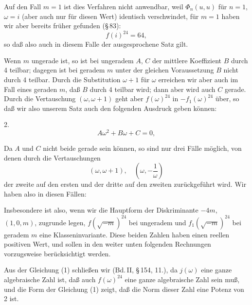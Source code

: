 

Auf den Fall $m=1$ ist dies Verfahren nicht anwendbar, weil $\Phi_n(u,u)$ für $n=1$, $\omega=i$ (aber auch nur für diesen Wert) identisch verschwindet, für $m=1$ haben wir aber bereits früher gefunden (\S\,83):
\[
f(i)^{24}=64,
\]
so daß also auch in diesem Falle der ausgesprochene Satz gilt.

Wenn $m$ ungerade ist, so ist bei ungeradem $A$, $C$ der mittlere Koeffizient $B$ durch 4 teilbar; dagegen ist bei geradem $m$ unter der gleichen Voraussetzung $B$ nicht durch 4 teilbar. Durch die Substitution $\omega+1$ für $\omega$ erreichen wir aber auch im Fall eines geraden $m$, daß $B$ durch 4 teilbar wird; dann aber wird auch $C$ gerade. Durch die Vertauschung $(\omega,\omega+1)$ geht aber $f(\omega)^{24}$ in $-f_1(\omega)^{24}$ über, so daß wir also unserem Satz auch den folgenden Ausdruck geben können:

2. 
\[
A\omega^2+B\omega+C=0,
\]

Da $A$ und $C$ nicht beide gerade sein können, so sind nur drei Fälle möglich, von denen durch die Vertauschungen
\[
(\omega,\omega+1),\quad \left(\omega,-\frac{1}{\omega}\right)
\]
der zweite auf den ersten und der dritte auf den zweiten zurückgeführt wird. Wir haben also in diesen Fällen:

Insbesondere ist also, wenn wir die Hauptform der Diskriminante $-4m$, $(1,0,m)$, zugrunde legen, $f(\sqrt{-m})^{24}$ bei ungeradem und $f_1(\sqrt{-m})^{24}$ bei geradem $m$ eine Klasseninvariante. Diese beiden Zahlen haben einen reellen positiven Wert, und sollen in den weiter unten folgenden Rechnungen vorzugsweise berücksichtigt werden.

Aus der Gleichung (1) schließen wir (Bd.\,II, \S\,154, 11.), da $j(\omega)$ eine ganze algebraische Zahl ist, daß auch $f(\omega)^{24}$ eine ganze algebraische Zahl sein muß, und die Form der Gleichung (1) zeigt, daß die Norm dieser Zahl eine Potenz von 2 ist.
